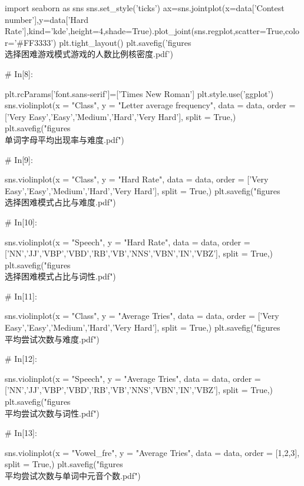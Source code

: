 \documentclass{MathModeling}
\begin{document}
\begin{python}
import seaborn as sns
sns.set_style('ticks')
ax=sns.jointplot(x=data['Contest number'],y=data['Hard Rate'],kind='kde',height=4,shade=True).plot_joint(sns.regplot,scatter=True,color='#FF3333')
plt.tight_layout()
plt.savefig('figures\\选择困难游戏模式游戏的人数比例核密度.pdf')


# In[8]:


plt.rcParams['font.sans-serif']=['Times New Roman']
plt.style.use('ggplot')
sns.violinplot(x = "Class",
               y = "Letter average frequency",
               data = data,
               order = ['Very Easy','Easy','Medium','Hard','Very Hard'],
               split = True,)
plt.savefig("figures\\单词字母平均出现率与难度.pdf")


# In[9]:


sns.violinplot(x = "Class",
               y = "Hard Rate",
               data = data,
               order = ['Very Easy','Easy','Medium','Hard','Very Hard'],
               split = True,)
plt.savefig("figures\\选择困难模式占比与难度.pdf")


# In[10]:


sns.violinplot(x = "Speech",
               y = "Hard Rate",
               data = data,
               order = ['NN','JJ','VBP','VBD','RB','VB','NNS','VBN','IN','VBZ'],
               split = True,)
plt.savefig("figures\\选择困难模式占比与词性.pdf")


# In[11]:


sns.violinplot(x = "Class",
               y = "Average Tries",
               data = data,
               order = ['Very Easy','Easy','Medium','Hard','Very Hard'],
               split = True,)
plt.savefig("figures\\平均尝试次数与难度.pdf")


# In[12]:


sns.violinplot(x = "Speech",
               y = "Average Tries",
               data = data,
               order = ['NN','JJ','VBP','VBD','RB','VB','NNS','VBN','IN','VBZ'],
               split = True,)
plt.savefig("figures\\平均尝试次数与词性.pdf")


# In[13]:


sns.violinplot(x = "Vowel_fre",
               y = "Average Tries",
               data = data,
               order = [1,2,3],
               split = True,)
plt.savefig("figures\\平均尝试次数与单词中元音个数.pdf")



\end{python}
\end{document}
